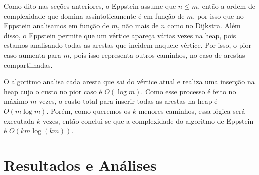 \documentclass[12pt]{article}
\begin{document}
    Como dito nas seções anteriores, o Eppstein assume que $n \leq m$, então a ordem de complexidade que domina assintoticamente é em função de $m$, por isso que no Eppstein analisamos em função de $m$, não mais de $n$ como no Dijkstra. Além disso, o Eppstein permite que um vértice apareça várias vezes na heap, pois estamos analisando todas as arestas que incidem naquele vértice. Por isso, o pior caso aumenta para $m$, pois isso representa outros caminhos, no caso de arestas compartilhadas.
    
    O algoritmo analisa cada aresta que sai do vértice atual e realiza uma inserção na heap cujo o custo no pior caso é $O(\log m)$. Como esse processo é feito no máximo $m$ vezes, o custo total para inserir todas as arestas na heap é $O(m \log m)$. Porém, como queremos os $k$ menores caminhos, essa lógica será executada $k$ vezes, então conclui-se que a complexidade do algoritmo de Eppstein é $O(km \log (km))$.

    \section{Resultados e Análises}


    \printbibliography[title={Whole bibliography}]
\end{document}
